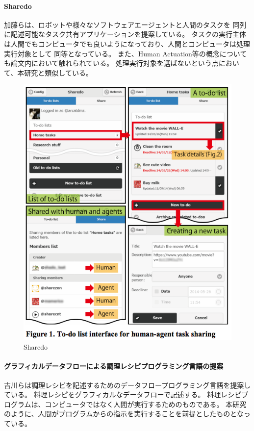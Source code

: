 \paragraph{Sharedo}\label{sharedo}

\mbox{}

加藤ら\cite{sharedo}は、ロボットや様々なソフトウェアエージェントと人間のタスクを
同列に記述可能なタスク共有アプリケーションを提案している。
タスクの実行主体は人間でもコンピュータでも良いようになっており、人間とコンピュータは処理実行対象として
同等となっている。 また、Human
Actuation等の概念についても論文内において触れられている。
処理実行対象を選ばないという点において、本研究と類似している。

\begin{figure}[htbp]
  \begin{center}
  \includegraphics[width=.5\linewidth,bb=0 0 497 611]{images/sharedo.png}
  \end{center}
  \caption{Sharedo}
  \label{fig:sharedo}
\end{figure}

\paragraph{グラフィカルデータフローによる調理レシピプログラミング言語の提案}\label{ux30b0ux30e9ux30d5ux30a3ux30abux30ebux30c7ux30fcux30bfux30d5ux30edux30fcux306bux3088ux308bux8abfux7406ux30ecux30b7ux30d4ux30d7ux30edux30b0ux30e9ux30dfux30f3ux30b0ux8a00ux8a9eux306eux63d0ux6848}

\mbox{}

吉川らは調理レシピを記述するためのデータフロープログラミング言語を提案している\cite{recipe-programming}。
料理レシピをグラフィカルなデータフローで記述する。
料理レシピプログラムは、コンピュータではなく人間が実行するためのものである。
本研究のように、人間がプログラムからの指示を実行することを前提としたものとなっている。

